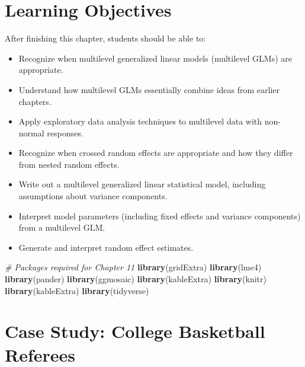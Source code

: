\documentclass[
]{krantz}
\newenvironment{Shaded}{\begin{snugshade}}{\end{snugshade}}
\newcommand{\CommentTok}[1]{\textcolor[rgb]{0.37,0.37,0.37}{\textit{#1}}}
\newcommand{\KeywordTok}[1]{\textcolor[rgb]{0.27,0.27,0.27}{\textbf{#1}}}
\newcommand{\NormalTok}[1]{#1}
\providecommand{\tightlist}{%
  \setlength{\itemsep}{0pt}\setlength{\parskip}{0pt}}
\begin{document}
\hypertarget{objectives}{%
\section{Learning Objectives}\label{objectives}}

After finishing this chapter, students should be able to:

\begin{itemize}
\tightlist
\item
  Recognize when multilevel generalized linear models (multilevel GLMs) are appropriate.
\item
  Understand how multilevel GLMs essentially combine ideas from earlier chapters.
\item
  Apply exploratory data analysis techniques to multilevel data with non-normal responses.
\item
  Recognize when crossed random effects are appropriate and how they differ from nested random effects.
\item
  Write out a multilevel generalized linear statistical model, including assumptions about variance components.
\item
  Interpret model parameters (including fixed effects and variance components) from a multilevel GLM.
\item
  Generate and interpret random effect estimates.
\end{itemize}

\begin{Shaded}
\begin{Highlighting}[]
\CommentTok{# Packages required for Chapter 11}
\KeywordTok{library}\NormalTok{(gridExtra)}
\KeywordTok{library}\NormalTok{(lme4)}
\KeywordTok{library}\NormalTok{(pander)}
\KeywordTok{library}\NormalTok{(ggmosaic)}
\KeywordTok{library}\NormalTok{(kableExtra)}
\KeywordTok{library}\NormalTok{(knitr)}
\KeywordTok{library}\NormalTok{(kableExtra)}
\KeywordTok{library}\NormalTok{(tidyverse)}
\end{Highlighting}
\end{Shaded}

\hypertarget{cs:refs}{%
\section{Case Study: College Basketball Referees}\label{cs:refs}}
\end{document}

